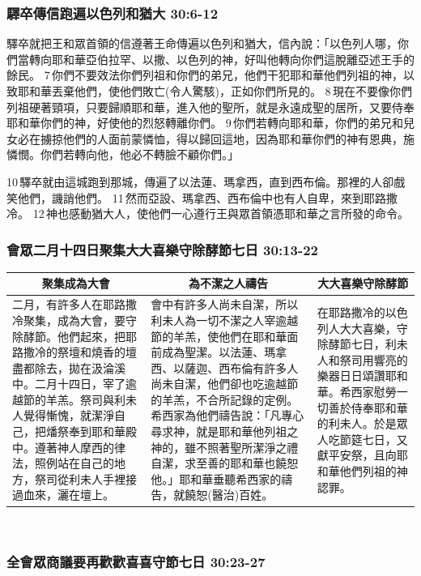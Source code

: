 \subsubsection{驛卒傳信跑遍以色列和猶大 30:6-12}
驛卒就把王和眾首領的信遵著王命傳遍以色列和猶大，信內說：「以色列人哪，你們當轉向耶和華亞伯拉罕、以撒、以色列的神，好叫他轉向你們這脫離亞述王手的餘民。 7 你們不要效法你們列祖和你們的弟兄，他們干犯耶和華他們列祖的神，以致耶和華丟棄他們，使他們敗亡(令人驚駭)，正如你們所見的。 8 現在不要像你們列祖硬著頸項，只要歸順耶和華，進入他的聖所，就是永遠成聖的居所，又要侍奉耶和華你們的神，好使他的烈怒轉離你們。 9 你們若轉向耶和華，你們的弟兄和兒女必在擄掠他們的人面前蒙憐恤，得以歸回這地，因為耶和華你們的神有恩典，施憐憫。你們若轉向他，他必不轉臉不顧你們。」


10 驛卒就由這城跑到那城，傳遍了以法蓮、瑪拿西，直到西布倫。那裡的人卻戲笑他們，譏誚他們。 11 然而亞設、瑪拿西、西布倫中也有人自卑，來到耶路撒冷。 12 神也感動猶大人，使他們一心遵行王與眾首領憑耶和華之言所發的命令。

\subsubsection{會眾二月十四日聚集大大喜樂守除酵節七日 30:13-22}
\begin{table}[H]
\centering
\begin{tabular}{p{}|p{7.25cm}|p{}}\hline\hline
\multicolumn{1}{c|}{聚集成為大會}&\multicolumn{1}{c|}{為不潔之人禱告}&\multicolumn{1}{c}{大大喜樂守除酵節}\\\hline
二月，有許多人在耶路撒冷聚集，成為大會，要守除酵節。他們起來，把耶路撒冷的祭壇和燒香的壇盡都除去，拋在汲淪溪中。二月十四日，宰了逾越節的羊羔。祭司與利未人覺得慚愧，就潔淨自己，把燔祭奉到耶和華殿中。遵著神人摩西的律法，照例站在自己的地方，祭司從利未人手裡接過血來，灑在壇上。
&會中有許多人尚未自潔，所以利未人為一切不潔之人宰逾越節的羊羔，使他們在耶和華面前成為聖潔。以法蓮、瑪拿西、以薩迦、西布倫有許多人尚未自潔，他們卻也吃逾越節的羊羔，不合所記錄的定例。希西家為他們禱告說：「凡專心尋求神，就是耶和華他列祖之神的，雖不照著聖所潔淨之禮自潔，求至善的耶和華也饒恕他。」耶和華垂聽希西家的禱告，就饒恕(醫治)百姓。
&在耶路撒冷的以色列人大大喜樂，守除酵節七日，利未人和祭司用響亮的樂器日日頌讚耶和華。希西家慰勞一切善於侍奉耶和華的利未人。於是眾人吃節筵七日，又獻平安祭，且向耶和華他們列祖的神認罪。\\\hline 
\end{tabular}
\end{table} 
 

\subsubsection{全會眾商議要再歡歡喜喜守節七日 30:23-27}

